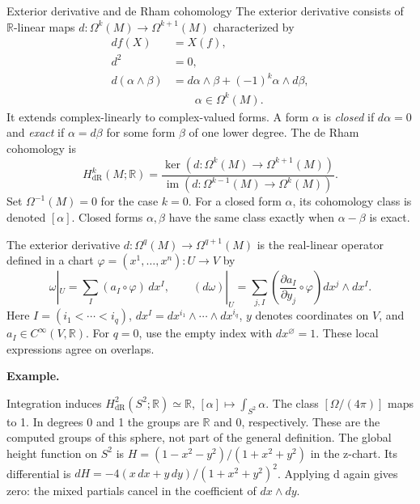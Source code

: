 \documentclass[11pt]{article}
\makeatletter
\newcommand{\R}{\mathbb R}
\newcounter{definition}
\newcommand{\exampleheading}{\par\medskip\textbf{Example.}\par\smallskip}
\newcommand{\currentdefinition}[1]{\protected@edef\@currentlabel{#1}}
\makeatother
\begin{document}
\begin{definitionbox}{Exterior derivative and de Rham cohomology}
\currentdefinition{\thedefinition}
\label{source:S22}
\label{def:06-10}
\label{def:06-14}
\label{def:06-11}
\label{def:06-12}
The exterior derivative consists of $\R$-linear maps
$d:\Omega^k(M)\to\Omega^{k+1}(M)$ characterized by
\begin{align*}
df(X)&=X(f),\\
d^2&=0,\\
d(\alpha\wedge\beta)&=d\alpha\wedge\beta+(-1)^k\alpha\wedge d\beta,
\\[-2pt]
&\qquad \alpha\in\Omega^k(M).
\end{align*}
It extends complex-linearly to complex-valued forms.
A form $\alpha$ is \emph{closed} if $d\alpha=0$ and \emph{exact} if
$\alpha=d\beta$ for some form $\beta$ of one lower degree.
The de Rham cohomology is
\[
H^k_{\mathrm{dR}}(M;\R)=
\frac{\ker(d:\Omega^k(M)\to\Omega^{k+1}(M))}
{\operatorname{im}(d:\Omega^{k-1}(M)\to\Omega^k(M))}.
\]
Set $\Omega^{-1}(M)=0$ for the case $k=0$.
For a closed form $\alpha$, its cohomology class is denoted $[\alpha]$.
Closed forms $\alpha,\beta$ have the same class exactly when
$\alpha-\beta$ is exact.


The exterior derivative $d:\Omega^q(M)\to\Omega^{q+1}(M)$ is the real-linear operator defined in a chart $\varphi=(x^1,\ldots,x^n):U\to V$ by
\[\omega|_U=\sum_I(a_I\circ\varphi)\,dx^I,\qquad
(d\omega)|_U=\sum_{j,I}\left(\frac{\partial a_I}{\partial y_j}\circ\varphi\right)dx^j\wedge dx^I.\]
Here $I=(i_1<\cdots<i_q)$, $dx^I=dx^{i_1}\wedge\cdots\wedge dx^{i_q}$, $y$ denotes coordinates on $V$, and $a_I\in C^\infty(V,\R)$. For $q=0$, use the empty index with $dx^\varnothing=1$. These local expressions agree on overlaps.

\exampleheading
Integration induces $H^2_{\mathrm{dR}}(S^2;\R)\simeq\R$, $[\alpha]\mapsto\int_{S^2}\alpha$. The class $[\Omega/(4\pi)]$ maps to 1. In degrees 0 and 1 the groups are $\R$ and 0, respectively. These are the computed groups of this sphere, not part of the general definition. The global height function on $S^2$ is $H=(1-x^2-y^2)/(1+x^2+y^2)$ in the z-chart. Its differential is $dH=-4(x\,dx+y\,dy)/(1+x^2+y^2)^2$. Applying d again gives zero: the mixed partials cancel in the coefficient of $dx\wedge dy$.
\end{definitionbox}
\end{document}
